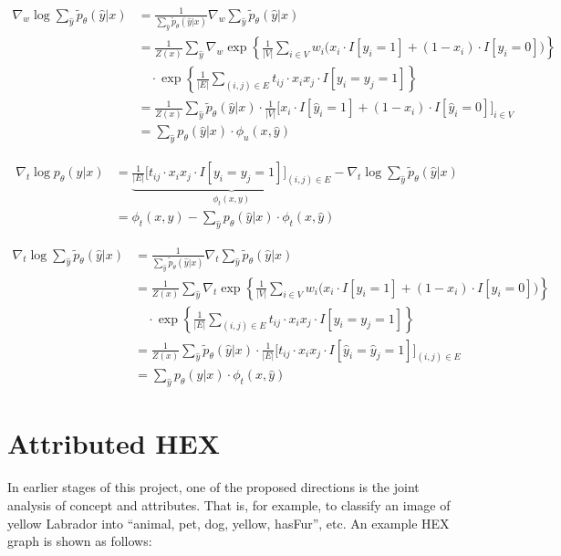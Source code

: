 \documentclass[11pt,a4paper]{article}
\begin{document}
\begin{align*}
\nabla_w\log\sum_{\hat{y}}\tilde{p}_\theta(\hat{y}|x)&=\frac{1}{\sum_{\hat{y}}\tilde{p}_\theta(\hat{y}|x)}\nabla_w\sum_{\hat{y}}\tilde{p}_\theta(\hat{y}|x)\\
&=\frac{1}{Z(x)}\sum_{\hat{y}}\nabla_w\exp\left\{\frac{1}{|V|}\sum_{i\in V}w_i\big(x_i\cdot I[y_i=1]+(1-x_i)\cdot I[y_i=0]\big)\right\}\\
&\quad\cdot\exp\left\{\frac{1}{|E|}\sum_{(i,j)\in E}t_{ij}\cdot x_ix_j\cdot I[y_i=y_j=1]\right\}\\
&=\frac{1}{Z(x)}\sum_{\hat{y}}\tilde{p}_\theta(\hat{y}|x)\cdot\frac{1}{|V|}\Big[x_i\cdot I[\hat{y}_i=1]+(1-x_i)\cdot I[\hat{y}_i=0]\Big]_{i\in V}\\
&=\sum_{\hat{y}}p_\theta(\hat{y}|x)\cdot\phi_u(x,\hat{y})
\end{align*}

\begin{align*}
\nabla_t\log p_\theta(y|x)&=\underbrace{\frac{1}{|E|}\Big[t_{ij}\cdot x_ix_j\cdot I[y_i=y_j=1]\Big]_{(i,j)\in E}}_{\phi_t(x,y)}-\nabla_t\log\sum_{\hat{y}}\tilde{p}_\theta(\hat{y}|x)\\
&=\phi_t(x,y)-\sum_{\hat{y}}p_\theta(\hat{y}|x)\cdot\phi_t(x,\hat{y})
\end{align*}

\begin{align*}
\nabla_t\log\sum_{\hat{y}}\tilde{p}_\theta(\hat{y}|x)&=\frac{1}{\sum_{\hat{y}}\tilde{p}_\theta(\hat{y}|x)}\nabla_t\sum_{\hat{y}}\tilde{p}_\theta(\hat{y}|x)\\
&=\frac{1}{Z(x)}\sum_{\hat{y}}\nabla_t\exp\left\{\frac{1}{|V|}\sum_{i\in V}w_i\big(x_i\cdot I[y_i=1]+(1-x_i)\cdot I[y_i=0]\big)\right\}\\
&\quad\cdot\exp\left\{\frac{1}{|E|}\sum_{(i,j)\in E}t_{ij}\cdot x_ix_j\cdot I[y_i=y_j=1]\right\}\\
&=\frac{1}{Z(x)}\sum_{\hat{y}}\tilde{p}_\theta(\hat{y}|x)\cdot\frac{1}{|E|}\Big[t_{ij}\cdot x_ix_j\cdot I[\hat{y}_i=\hat{y}_j=1]\Big]_{(i,j)\in E}\\
&=\sum_{\hat{y}}p_\theta(\hat{y}|x)\cdot\phi_t(x,\hat{y})
\end{align*}

\appendix
\section{Attributed HEX}

In earlier stages of this project, one of the proposed directions is the joint analysis of concept and attributes. That is, for example, to classify an image of yellow Labrador into ``animal, pet, dog, yellow, hasFur'', etc. An example HEX graph is shown as follows:
\end{document}
